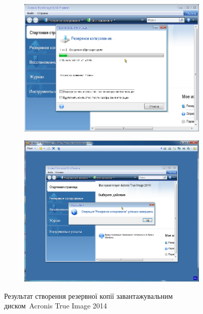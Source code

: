 \documentclass[
	a4paper,
	oneside,
	BCOR = 10mm,
	DIV = 12,
	12pt,
	headings = normal,
]{scrartcl}
\newlength{\gridunitwidth}
\begin{document}
				\begin{figure}[!htbp]
					\begin{subfigure}{5.5\gridunitwidth}
						\includegraphics[width = \columnwidth]{./assets/y03s01-pcdiag-lab-04-p03.png}
						\caption{}
						\label{subfig:02-01-acronis-true-image-disk-backup-inprocess}
					\end{subfigure}%
					\hspace{1\gridunitwidth}%
					\begin{subfigure}{5.5\gridunitwidth}
						\includegraphics[width = \columnwidth]{./assets/y03s01-pcdiag-lab-04-p04.png}
						\caption{}
						\label{subfig:02-01-acronis-true-image-disk-backup-res}
					\end{subfigure}%
					\caption{Результат створення резервної копії завантажувальним диском~\textenglish{Acronis True Image 2014}}
					\label{fig:02-acronis-true-image-disk-backup-res}
				\end{figure}
\end{document}
